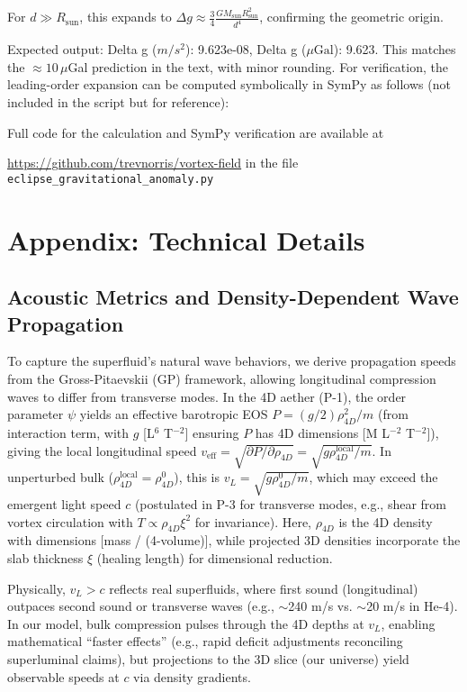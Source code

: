 \documentclass{article}
\begin{document}
For \(d \gg R_\text{sun}\), this expands to \(\Delta g \approx \frac{3}{4} \frac{G M_\text{sun} R_\text{sun}^2}{d^4}\), confirming the geometric origin.

Expected output: Delta g ($m/s^2$): 9.623e-08, Delta g ($\mu\text{Gal}$): 9.623. This matches the \(\approx 10 \, \mu\)Gal prediction in the text, with minor rounding. For verification, the leading-order expansion can be computed symbolically in SymPy as follows (not included in the script but for reference):

Full code for the calculation and SymPy verification are available at

\noindent\url{https://github.com/trevnorris/vortex-field} in the file \verb|eclipse_gravitational_anomaly.py|


\section{Appendix: Technical Details}

\subsection{Acoustic Metrics and Density-Dependent Wave Propagation}

To capture the superfluid's natural wave behaviors, we derive propagation speeds from the Gross-Pitaevskii (GP) framework, allowing longitudinal compression waves to differ from transverse modes. In the 4D aether (P-1), the order parameter $\psi$ yields an effective barotropic EOS $P = (g / 2) \rho_{4D}^2 / m$ (from interaction term, with $g$ [L$^6$ T$^{-2}$] ensuring $P$ has 4D dimensions [M L$^{-2}$ T$^{-2}$]), giving the local longitudinal speed $v_{\text{eff}} = \sqrt{\partial P / \partial \rho_{4D}} = \sqrt{g \rho_{4D}^{\text{local}} / m}$. In unperturbed bulk ($\rho_{4D}^{\text{local}} = \rho_{4D}^0$), this is $v_L = \sqrt{g \rho_{4D}^0 / m}$, which may exceed the emergent light speed $c$ (postulated in P-3 for transverse modes, e.g., shear from vortex circulation with $T \propto \rho_{4D} \xi^2$ for invariance). Here, $\rho_{4D}$ is the 4D density with dimensions [mass / (4-volume)], while projected 3D densities incorporate the slab thickness $\xi$ (healing length) for dimensional reduction.

Physically, $v_L > c$ reflects real superfluids, where first sound (longitudinal) outpaces second sound or transverse waves (e.g., $\sim$240 m/s vs. $\sim$20 m/s in He-4). In our model, bulk compression pulses through the 4D depths at $v_L$, enabling mathematical ``faster effects'' (e.g., rapid deficit adjustments reconciling superluminal claims), but projections to the 3D slice (our universe) yield observable speeds at $c$ via density gradients.
\end{document}
